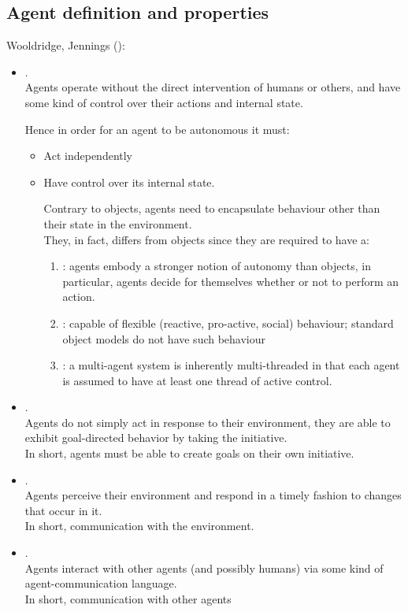 \subsection{Agent definition and properties}
Wooldridge, Jennings ():\\
\begin{itemize}
\item {}.\\
Agents operate without the direct intervention of humans or others, and have some kind of control over their actions and internal state.

Hence in order for an agent to be autonomous it must:
\begin{itemize}
\item Act independently
\item Have control over its internal state.

Contrary to objects, agents need to encapsulate behaviour other than their state in the environment.\\
They, in fact, differs from objects since they are required to have a:
\begin{enumerate}
\item {}: agents embody a stronger notion of autonomy than objects, in particular, agents decide for themselves whether or not to perform an action.
\item {}: capable of flexible (reactive, pro-active, social) behaviour; standard object models do not have such behaviour
\item {}: a multi-agent system is inherently multi-threaded in that each agent is assumed to have at least one thread of active control.
\end{enumerate}
\end{itemize}
\item {}.\\
Agents do not simply act in response to their environment, they are able to exhibit goal-directed behavior by taking the initiative.\\
In short, agents must be able to create goals on their own initiative.
\item {}.\\
Agents perceive their environment and respond in a timely fashion to changes that occur in it.\\
In short, communication with the environment.
\item {}.\\
Agents interact with other agents (and possibly humans) via some kind of agent-communication language.\\
In short, communication with other agents
\end{itemize}


